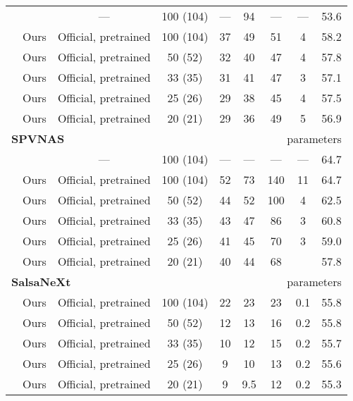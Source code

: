 \documentclass[runningheads]{tpls/llncs}
\begin{document}
\begin{table*}[t]
\begin{tabular*}{\textwidth}{@{}l@{\extracolsep{\fill}}*{8}{c}@{}}
        & \cite{Zhang_2020_CVPR} & --- & 100 (104) & --- & 94 & --- & --- & 53.6 \\ 
        & Ours    & Official, pretrained & 100 (104) & 37 & 49 & 51 & 4 & 58.2 \\ 
        & Ours    & Official, pretrained & 50 (52)   & 32 & 40 & 47 & 4 & 57.8  \\
        & Ours    & Official, pretrained & 33 (35)   & 31 & 41 & 47 & 3 & 57.1 \\ 
        & Ours    & Official, pretrained & 25 (26)   & 29 & 38 & 45 & 4 & 57.5 \\ 
        & Ours    & Official, pretrained & 20 (21)   & 29 & 36 & 49 & 5 & 56.9 \\ 
        \midrule
        \multicolumn{4}{l}{\textbf{SPVNAS~\cite{tang2020searching}}} & & \multicolumn{4}{r}{\scriptsize  parameters} \\
              & \cite{tang2020searching} & --- & 100 (104) & --- & --- & --- & --- & 64.7  \\
         & Ours    & Official, pretrained & 100 (104) & 52 & 73 & 140 & 11 & 64.7  \\
         & Ours    & Official, pretrained & 50 (52)   & 44 & 52 & 100 & 4 & 62.5  \\
         & Ours    & Official, pretrained & 33 (35)   & 43 & 47 & 86  & 3 & 60.8  \\
         & Ours    & Official, pretrained & 25 (26)   & 41 & 45 & 70 & 3 & 59.0  \\
         & Ours    & Official, pretrained & 20 (21)   & 40 & 44 & 68  &  & 57.8  \\
        \midrule
        \multicolumn{4}{l}{\textbf{SalsaNeXt~\cite{cortinhal2020salsanext}}} & & \multicolumn{4}{r}{\scriptsize  parameters} \\
         & Ours    & Official, pretrained & 100 (104) & 22 & 23 & 23 & 0.1 & 55.8  \\
         & Ours    & Official, pretrained & 50 (52)   & 12 & 13 & 16 & 0.2 & 55.8  \\
         & Ours    & Official, pretrained & 33 (35)   & 10 & 12 & 15 & 0.2 & 55.7  \\
         & Ours    & Official, pretrained & 25 (26)   & 9  & 10 & 13 & 0.2 & 55.6  \\
         & Ours    & Official, pretrained & 20 (21)   & 9  & 9.5 & 12 & 0.2 & 55.3 \\
        \bottomrule
    \end{tabular*}
\end{table*} 
\end{document}
